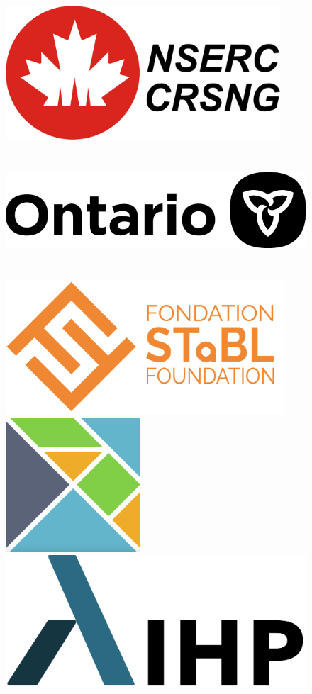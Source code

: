 \documentclass[22pt]{beamer}
\begin{document}
\begin{frame}[fragile]
\begin{textblock}{7.25}
        \begin{figure}[htbp]
            \centering
            \includegraphics[height=5cm,trim={0 0 28.5cm 0},clip]{nserc-logo.jpg}
            \hspace{0.5cm}
            \includegraphics[height=5cm,trim={16.5cm 0 0 0},clip]{ontario@2x-print.png}
            \hspace{0.5cm}
            \includegraphics[height=5cm]{STaBLLogoWS.png}
            \hspace{0.5cm}
            \includegraphics[height=5cm]{elm-logo.png}
            \hspace{0.5cm}
            \includegraphics[height=5cm]{IHPLogo.png}


\end{figure}
\end{textblock}
\end{frame}
\end{document}
